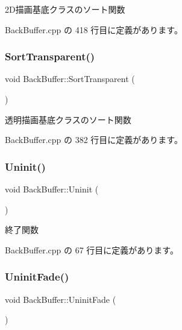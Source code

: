 2\+D描画基底クラスのソート関数 



 Back\+Buffer.\+cpp の 418 行目に定義があります。

\mbox{\label{class_back_buffer_af363b4d69affd48a1b0f65a000ff12b5}} 
\subsubsection{\texorpdfstring{Sort\+Transparent()}{SortTransparent()}}
{\footnotesize\ttfamily void Back\+Buffer\+::\+Sort\+Transparent (\begin{DoxyParamCaption}{ }\end{DoxyParamCaption})\hspace{0.3cm}{\ttfamily [private]}}



透明描画基底クラスのソート関数 



 Back\+Buffer.\+cpp の 382 行目に定義があります。

\mbox{\label{class_back_buffer_a18f0eebb58ad22bc0514edddf966eea7}} 
\subsubsection{\texorpdfstring{Uninit()}{Uninit()}}
{\footnotesize\ttfamily void Back\+Buffer\+::\+Uninit (\begin{DoxyParamCaption}{ }\end{DoxyParamCaption})}



終了関数 



 Back\+Buffer.\+cpp の 67 行目に定義があります。

\mbox{\label{class_back_buffer_ad3d3626427f53f060f5057ea6a22cac6}} 
\subsubsection{\texorpdfstring{Uninit\+Fade()}{UninitFade()}}
{\footnotesize\ttfamily void Back\+Buffer\+::\+Uninit\+Fade (\begin{DoxyParamCaption}{ }\end{DoxyParamCaption})}



